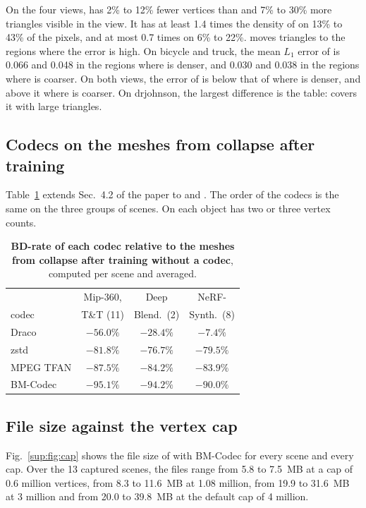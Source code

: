 On the four views, \BM has 2\% to 12\% fewer vertices than \MSc and 7\% to 30\% more triangles visible in the view. It has at least 1.4 times the density of \MSc on 13\% to 43\% of the pixels, and at most 0.7 times on 6\% to 22\%. \BM moves triangles to the regions where the error is high. On bicycle and truck, the mean $L_1$ error of \MSc is 0.066 and 0.048 in the regions where \BM is denser, and 0.030 and 0.038 in the regions where \BM is coarser. On both views, the error of \BM is below that of \MSc where \BM is denser, and above it where \BM is coarser. On drjohnson, the largest difference is the table: \MSc covers it with large triangles.


\subsection{Codecs on the meshes from collapse after training}
Table~\ref{sup:tab:collapse-bd} extends Sec.~4.2 of the paper to \DeepBlending and \NeRFSyn. The order of the codecs is the same on the three groups of scenes. On \NeRFSyn each object has two or three vertex counts.

\begin{table}[!htb]\centering\footnotesize
\caption{\textbf{BD-rate of each codec relative to the meshes from collapse after training without a codec}, computed per scene and averaged.}
\label{sup:tab:collapse-bd}
\begin{tabular}{@{}lccc@{}}
\toprule
 & Mip-360, & Deep & NeRF- \\
codec & T\&T (11) & Blend.\ (2) & Synth.\ (8) \\
\midrule
Draco & $-56.0\%$ & $-28.4\%$ & $-7.4\%$ \\
zstd & $-81.8\%$ & $-76.7\%$ & $-79.5\%$ \\
MPEG TFAN & $-87.5\%$ & $-84.2\%$ & $-83.9\%$ \\
BM-Codec & $-95.1\%$ & $-94.2\%$ & $-90.0\%$ \\
\bottomrule
\end{tabular}
\end{table}

\subsection{File size against the vertex cap}
Fig.~\ref{sup:fig:cap} shows the file size of \MSc with BM-Codec for every scene and every cap. Over the 13 captured scenes, the files range from 5.8 to 7.5~MB at a cap of 0.6 million vertices, from 8.3 to 11.6~MB at 1.08 million, from 19.9 to 31.6~MB at 3 million and from 20.0 to 39.8~MB at the default cap of 4 million.

